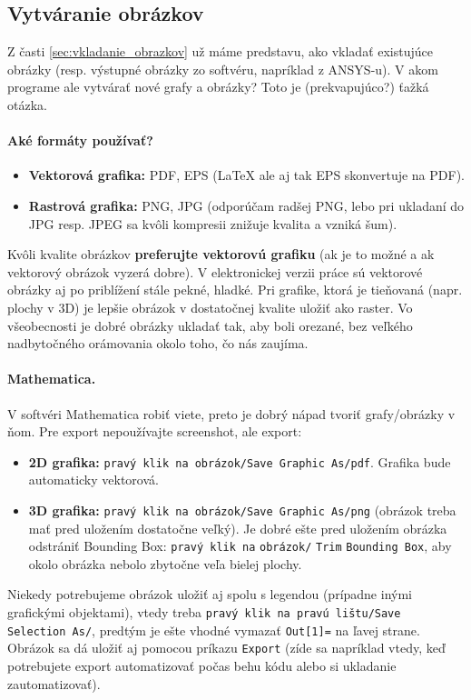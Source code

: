 \subsection{Vytváranie obrázkov}

Z časti \ref{sec:vkladanie_obrazkov} už máme predstavu, ako vkladať existujúce obrázky (resp. výstupné obrázky zo softvéru, napríklad z ANSYS-u). V akom programe ale vytvárať nové grafy a obrázky? Toto je (prekvapujúco?) ťažká otázka.

\paragraph{Aké formáty používať?}

\begin{itemize}
	\item \textbf{Vektorová grafika:} PDF, EPS (LaTeX ale aj tak EPS skonvertuje na PDF).
	\item \textbf{Rastrová grafika:} PNG, JPG (odporúčam radšej PNG, lebo pri ukladaní do JPG resp. JPEG sa kvôli kompresii znižuje kvalita a vzniká šum).
\end{itemize}
Kvôli kvalite obrázkov \textbf{preferujte vektorovú grafiku} (ak je to možné a ak vektorový obrázok vyzerá dobre). V elektronickej verzii práce sú vektorové obrázky aj po priblížení stále pekné, hladké. Pri grafike, ktorá je tieňovaná (napr. plochy v 3D) je lepšie obrázok v dostatočnej kvalite uložiť ako raster. Vo všeobecnosti je dobré obrázky ukladať tak, aby boli orezané, bez veľkého nadbytočného orámovania okolo toho, čo nás zaujíma.


\paragraph{Mathematica.}

V softvéri Mathematica robiť viete, preto je dobrý nápad tvoriť grafy/obrázky v ňom. Pre export nepoužívajte screenshot, ale export:
\begin{itemize}
	\item \textbf{2D grafika:} \verb|pravý klik na obrázok/Save Graphic As/pdf|. Grafika bude automaticky vektorová.
	\item \textbf{3D grafika:} \verb|pravý klik na obrázok/Save Graphic As/png| (obrázok treba mať pred uložením dostatočne veľký). Je dobré ešte pred uložením obrázka odstrániť Bounding Box: \verb|pravý klik na| \verb|obrázok/| \verb|Trim| \verb|Bounding Box|, aby okolo obrázka nebolo zbytočne veľa bielej plochy.
\end{itemize}
Niekedy potrebujeme obrázok uložiť aj spolu s legendou (prípadne inými grafickými objektami), vtedy treba \verb|pravý klik na pravú lištu/Save Selection As/|, predtým je ešte vhodné vymazať \verb|Out[1]=| na ľavej strane. Obrázok sa dá uložiť aj pomocou príkazu \verb|Export| (zíde sa napríklad vtedy, keď potrebujete export automatizovať počas behu kódu alebo si ukladanie zautomatizovať).



